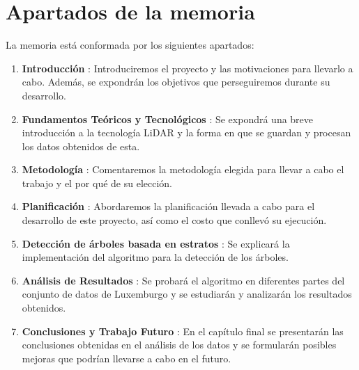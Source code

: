 \section{Apartados de la memoria}
\label{sec:apartados}
La memoria está conformada por los siguientes apartados:
\begin{enumerate}
    \item \textbf{Introducción} : Introduciremos el proyecto y las motivaciones para llevarlo a cabo. Además, se expondrán los objetivos que perseguiremos durante su desarrollo.

    \item \textbf{Fundamentos Teóricos y Tecnológicos} : Se expondrá una breve introducción a la tecnología LiDAR y la forma en que se guardan y procesan los datos obtenidos de esta.
    
    \item \textbf{Metodología} : Comentaremos la metodología elegida para llevar a cabo el trabajo y el por qué de su elección.
    
    \item \textbf{Planificación} : Abordaremos la planificación llevada a cabo para el desarrollo de este proyecto, así como el costo que conllevó su ejecución.
    
    \item \textbf{Detección de árboles basada en estratos} : Se explicará la implementación del algoritmo para la detección de los árboles.
    
    \item \textbf{Análisis de Resultados} : Se probará el algoritmo en diferentes partes del conjunto de datos de Luxemburgo y se estudiarán y analizarán los resultados obtenidos.
    
    \item \textbf{Conclusiones y Trabajo Futuro} : En el capítulo final se presentarán las conclusiones obtenidas en el análisis de los datos y se formularán posibles mejoras que podrían llevarse a cabo en el futuro.


\end{enumerate}

